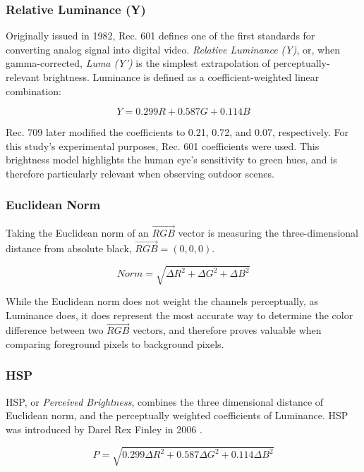 \subsubsection{Relative Luminance (Y)}

Originally issued in 1982, Rec. 601 \cite{bt601} defines one of the first standards for converting analog signal into digital video. \textit{Relative Luminance (Y)}, or, when gamma-corrected, \textit{Luma (Y')} is the simplest extrapolation of perceptually-relevant brightness. Luminance is defined as a coefficient-weighted linear combination:

\begin{equation}
Y = 0.299R + 0.587G + 0.114B
\end{equation}

Rec. 709 later modified the coefficients to 0.21, 0.72, and 0.07, respectively. For this study's experimental purposes, Rec. 601 coefficients were used. This brightness model highlights the human eye's sensitivity to green hues, and is therefore particularly relevant when observing outdoor scenes. 

\subsubsection{Euclidean Norm}

Taking the Euclidean norm of an $\vec{RGB}$ vector is measuring the three-dimensional distance from absolute black, $\vec{RGB} = (0,0,0)$. 

\begin{equation}
Norm = \sqrt{\Delta R^2 + \Delta G^2 + \Delta B^2}
\end{equation}

While the Euclidean norm does not weight the channels perceptually, as Luminance does, it does represent the most accurate way to determine the color difference between two $\vec{RGB}$ vectors, and therefore proves valuable when comparing foreground pixels to background pixels. 

\subsubsection{HSP}

HSP, or \textit{Perceived Brightness}, combines the three dimensional distance of Euclidean norm, and the perceptually weighted coefficients of Luminance. HSP was introduced by Darel Rex Finley in 2006 \cite{hsp2006}.

\begin{equation}
P = \sqrt{0.299\Delta R^2 + 0.587\Delta G^2 + 0.114\Delta B^2}
\end{equation}

